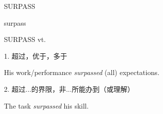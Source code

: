 \begin{flashcard}{
SURPASS

surpass
}
\begin{center}
SURPASS vt. 
\end{center}
1. 超过，优于，多于

His work/performance \textit{surpassed} (all) expectations.

2. 超过...的界限，非...所能办到（或理解）

The task \textit{surpassed} his skill.

\end{flashcard}
